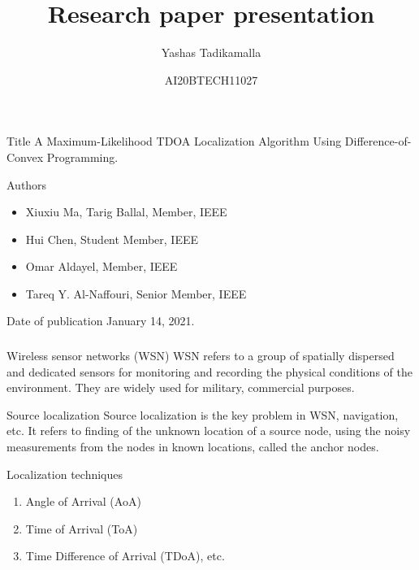 \documentclass{beamer}
\title{Research paper presentation}
\author{Yashas Tadikamalla}
\date{AI20BTECH11027}
\begin{document}
\begin{frame}
\titlepage
\end{frame}

\begin{frame}
    \begin{block}{Title}
    A Maximum-Likelihood TDOA Localization Algorithm Using Difference-of-Convex Programming.
    \end{block}
    \begin{block}{Authors}
    \begin{itemize}
        \item Xiuxiu Ma, Tarig Ballal, Member, IEEE
        \item Hui Chen, Student Member, IEEE
        \item Omar Aldayel, Member, IEEE
        \item Tareq Y. Al-Naffouri, Senior Member, IEEE
    \end{itemize}
    \end{block}
    \begin{block}{Date of publication}
    January 14, 2021.
    \end{block}
\end{frame}

\begin{frame}
\frametitle{}
\begin{block}{Wireless sensor networks (WSN)}
WSN refers to a group of spatially dispersed and dedicated sensors for monitoring and recording the physical conditions of the environment. They are widely used for military, commercial purposes.
\end{block}
\begin{block}{Source localization}
Source localization is the key problem in WSN, navigation, etc. It refers to finding of the unknown location of a source node, using the noisy measurements from the nodes in known locations, called the anchor nodes. 
\end{block}
\begin{block}{Localization techniques}
\begin{enumerate}
    \item Angle of Arrival (AoA)
    \item Time of Arrival (ToA)
    \item Time Difference of Arrival (TDoA), etc.
\end{enumerate} 
\end{block}

\end{frame}
\end{document}
